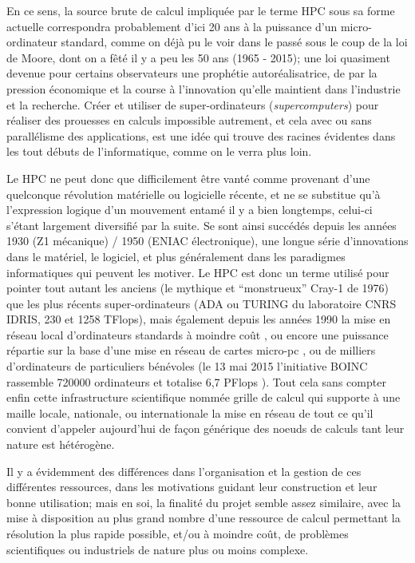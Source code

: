 En ce sens, la source brute de calcul impliquée par le terme HPC sous sa forme actuelle correspondra probablement d'ici 20 ans à la puissance d'un micro-ordinateur standard, comme on déjà pu le voir dans le passé sous le coup de la loi de Moore, dont on a fêté il y a peu les 50 ans (1965 - 2015); une loi quasiment devenue pour certains observateurs une prophétie autoréalisatrice, de par la pression économique et la course à l'innovation qu'elle maintient dans l'industrie et la recherche. Créer et utiliser de super-ordinateurs (\textit{supercomputers}) pour réaliser des prouesses en calculs impossible autrement, et cela avec ou sans parallélisme des applications, est une idée qui trouve des racines évidentes dans les tout débuts de l'informatique, comme on le verra plus loin.

Le HPC ne peut donc que difficilement être vanté comme provenant d'une quelconque révolution matérielle ou logicielle récente, et ne se substitue qu'à l'expression logique d'un mouvement entamé il y a bien longtemps, celui-ci s'étant largement diversifié par la suite. Se sont ainsi succédés depuis les années 1930 (Z1 mécanique) / 1950 (ENIAC électronique), une longue série d'innovations dans le matériel, le logiciel, et plus généralement dans les paradigmes informatiques qui peuvent les motiver. Le HPC est donc un terme utilisé pour pointer tout autant les anciens (le mythique et \enquote{monstrueux} Cray-1 de 1976) que les plus récents super-ordinateurs (ADA ou TURING du laboratoire CNRS IDRIS, 230 et 1258 TFlops), mais également depuis les années 1990 la mise en réseau local d'ordinateurs standards à moindre coût , ou encore une puissance répartie sur la base d'une mise en réseau de cartes micro-pc , ou de milliers d'ordinateurs de particuliers bénévoles (le 13 mai 2015 l'initiative BOINC rassemble 720000 ordinateurs et totalise 6,7 PFlops ). Tout cela sans compter enfin cette infrastructure scientifique nommée grille de calcul qui supporte à une maille locale, nationale, ou internationale la mise en réseau de tout ce qu'il convient d'appeler aujourd'hui de façon générique des noeuds de calculs tant leur nature est hétérogène.

Il y a évidemment des différences dans l'organisation et la gestion de ces différentes ressources, dans les motivations guidant leur construction et leur bonne utilisation; mais en soi, la finalité du projet semble assez similaire, avec la mise à disposition au plus grand nombre d'une ressource de calcul permettant la résolution la plus rapide possible, et/ou à moindre coût, de problèmes scientifiques ou industriels de nature plus ou moins complexe.

